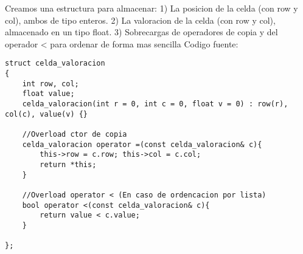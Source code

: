 
Creamos una estructura para almacenar:
1) La posicion de la celda (con row y col), ambos de tipo enteros.
2) La valoracion de la celda (con row y col), almacenado en un tipo float.
3) Sobrecargas de operadores de copia y del operador < para ordenar de forma mas sencilla
Codigo fuente:

\begin{lstlisting}
struct celda_valoracion
{
    int row, col;
    float value;
    celda_valoracion(int r = 0, int c = 0, float v = 0) : row(r), col(c), value(v) {}
    
    //Overload ctor de copia
    celda_valoracion operator =(const celda_valoracion& c){
        this->row = c.row; this->col = c.col;
        return *this;
    }

    //Overload operator < (En caso de ordencacion por lista)
    bool operator <(const celda_valoracion& c){
        return value < c.value;
    }

};
\end{lstlisting}